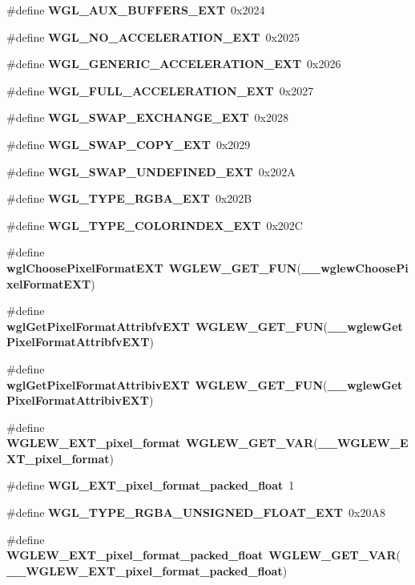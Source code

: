 \begin{DoxyCompactItemize}
\item 
\#define {\bf W\+G\+L\+\_\+\+A\+U\+X\+\_\+\+B\+U\+F\+F\+E\+R\+S\+\_\+\+E\+XT}~0x2024
\item 
\#define {\bf W\+G\+L\+\_\+\+N\+O\+\_\+\+A\+C\+C\+E\+L\+E\+R\+A\+T\+I\+O\+N\+\_\+\+E\+XT}~0x2025
\item 
\#define {\bf W\+G\+L\+\_\+\+G\+E\+N\+E\+R\+I\+C\+\_\+\+A\+C\+C\+E\+L\+E\+R\+A\+T\+I\+O\+N\+\_\+\+E\+XT}~0x2026
\item 
\#define {\bf W\+G\+L\+\_\+\+F\+U\+L\+L\+\_\+\+A\+C\+C\+E\+L\+E\+R\+A\+T\+I\+O\+N\+\_\+\+E\+XT}~0x2027
\item 
\#define {\bf W\+G\+L\+\_\+\+S\+W\+A\+P\+\_\+\+E\+X\+C\+H\+A\+N\+G\+E\+\_\+\+E\+XT}~0x2028
\item 
\#define {\bf W\+G\+L\+\_\+\+S\+W\+A\+P\+\_\+\+C\+O\+P\+Y\+\_\+\+E\+XT}~0x2029
\item 
\#define {\bf W\+G\+L\+\_\+\+S\+W\+A\+P\+\_\+\+U\+N\+D\+E\+F\+I\+N\+E\+D\+\_\+\+E\+XT}~0x202A
\item 
\#define {\bf W\+G\+L\+\_\+\+T\+Y\+P\+E\+\_\+\+R\+G\+B\+A\+\_\+\+E\+XT}~0x202B
\item 
\#define {\bf W\+G\+L\+\_\+\+T\+Y\+P\+E\+\_\+\+C\+O\+L\+O\+R\+I\+N\+D\+E\+X\+\_\+\+E\+XT}~0x202C
\item 
\#define {\bf wgl\+Choose\+Pixel\+Format\+E\+XT}~{\bf W\+G\+L\+E\+W\+\_\+\+G\+E\+T\+\_\+\+F\+UN}({\bf \+\_\+\+\_\+wglew\+Choose\+Pixel\+Format\+E\+XT})
\item 
\#define {\bf wgl\+Get\+Pixel\+Format\+Attribfv\+E\+XT}~{\bf W\+G\+L\+E\+W\+\_\+\+G\+E\+T\+\_\+\+F\+UN}({\bf \+\_\+\+\_\+wglew\+Get\+Pixel\+Format\+Attribfv\+E\+XT})
\item 
\#define {\bf wgl\+Get\+Pixel\+Format\+Attribiv\+E\+XT}~{\bf W\+G\+L\+E\+W\+\_\+\+G\+E\+T\+\_\+\+F\+UN}({\bf \+\_\+\+\_\+wglew\+Get\+Pixel\+Format\+Attribiv\+E\+XT})
\item 
\#define {\bf W\+G\+L\+E\+W\+\_\+\+E\+X\+T\+\_\+pixel\+\_\+format}~{\bf W\+G\+L\+E\+W\+\_\+\+G\+E\+T\+\_\+\+V\+AR}({\bf \+\_\+\+\_\+\+W\+G\+L\+E\+W\+\_\+\+E\+X\+T\+\_\+pixel\+\_\+format})
\item 
\#define {\bf W\+G\+L\+\_\+\+E\+X\+T\+\_\+pixel\+\_\+format\+\_\+packed\+\_\+float}~1
\item 
\#define {\bf W\+G\+L\+\_\+\+T\+Y\+P\+E\+\_\+\+R\+G\+B\+A\+\_\+\+U\+N\+S\+I\+G\+N\+E\+D\+\_\+\+F\+L\+O\+A\+T\+\_\+\+E\+XT}~0x20\+A8
\item 
\#define {\bf W\+G\+L\+E\+W\+\_\+\+E\+X\+T\+\_\+pixel\+\_\+format\+\_\+packed\+\_\+float}~{\bf W\+G\+L\+E\+W\+\_\+\+G\+E\+T\+\_\+\+V\+AR}({\bf \+\_\+\+\_\+\+W\+G\+L\+E\+W\+\_\+\+E\+X\+T\+\_\+pixel\+\_\+format\+\_\+packed\+\_\+float})

\end{DoxyCompactItemize}
